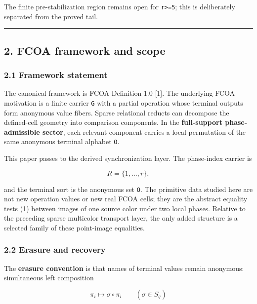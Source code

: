 The finite pre-stabilization region remains open for
\texttt{r\textgreater{}=5}; this is deliberately separated from the
proved tail.

\begin{center}\rule{0.5\linewidth}{0.5pt}\end{center}

\hypertarget{fcoa-framework-and-scope}{%
\subsection{2. FCOA framework and
scope}\label{fcoa-framework-and-scope}}

\hypertarget{framework-statement}{%
\subsubsection{2.1 Framework statement}\label{framework-statement}}

The canonical framework is FCOA Definition 1.0 {[}1{]}. The underlying
FCOA motivation is a finite carrier \texttt{G} with a partial operation
whose terminal outputs form anonymous value fibers. Sparse relational
reducts can decompose the defined-cell geometry into comparison
components. In the \textbf{full-support phase-admissible sector}, each
relevant component carries a local permutation of the same anonymous
terminal alphabet \texttt{O}.

This paper passes to the derived synchronization layer. The phase-index
carrier is

\[
R=\{1,\ldots,r\},
\]

and the terminal sort is the anonymous set \texttt{O}. The primitive
data studied here are not new operation values or new real FCOA cells;
they are the abstract equality tests (1) between images of one source
color under two local phases. Relative to the preceding sparse
multicolor transport layer, the only added structure is a selected
family of these point-image equalities.

\hypertarget{erasure-and-recovery}{%
\subsubsection{2.2 Erasure and recovery}\label{erasure-and-recovery}}

The \textbf{erasure convention} is that names of terminal values remain
anonymous: simultaneous left composition

\[
\pi_i\mapsto\sigma\circ\pi_i
\qquad(\sigma\in S_q)
\tag{7}
\]

